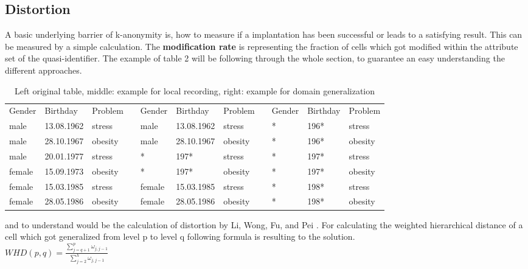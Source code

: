 \documentclass{llncs}
\begin{document}
\subsection{Distortion} 
A basic underlying barrier of k-anonymity is, how to measure if a implantation has been successful or leads to a satisfying result. This can be measured by a simple calculation. The \textbf{modification rate} is representing the fraction of cells which got modified within the attribute set of the quasi-identifier. The example of table 2 will be following through the whole section, to guarantee an easy understanding the different approaches. \\
\begin{table}[]
	\centering
	\label{table2}
	\begin{tabular}{lllllllllll}
		\cline{1-3} \cline{5-7} \cline{9-11}
		Gender & Birthday   & Problem &  & Gender & Birthday   & Problem &  & Gender & Birthday & Problem \\ \cline{1-3} \cline{5-7} \cline{9-11} 
		male   & 13.08.1962 & stress  &  & male   & 13.08.1962 & stress  &  & *      & 196*     & stress  \\
		male   & 28.10.1967 & obesity &  & male   & 28.10.1967 & obesity &  & *      & 196*     & obesity \\
		male   & 20.01.1977 & stress  &  & *      & 197*       & stress  &  & *      & 197*     & stress  \\
		female & 15.09.1973 & obesity &  & *      & 197*       & obesity &  & *      & 197*     & obesity \\
		female & 15.03.1985 & stress  &  & female & 15.03.1985 & stress  &  & *      & 198*     & stress  \\
		female & 28.05.1986 & obesity &  & female & 28.05.1986 & obesity &  & *      & 198*     & obesity \\ \cline{1-3} \cline{5-7} \cline{9-11}
		
	\end{tabular}
	\caption{Left original table, middle: example for local recording, right: example for domain generalization }
\end{table}
and to understand would be the calculation of distortion by Li, Wong, Fu, and Pei \cite{li2006achieving}. 
For calculating the weighted hierarchical distance of a cell which got generalized from level p to level q following formula is resulting to the solution.\\
$ WHD (p, q) = \frac{\sum_{j=q+1}^{p} \omega_{j,j-1}}{\sum_{j=2}^{h} \omega_{j,j-1}} $
\end{document}
